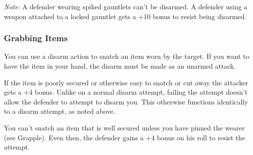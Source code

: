 \textit{Note:} A defender wearing spiked gauntlets can't be disarmed. A defender using a weapon attached to a locked gauntlet gets a +10 bonus to resist being disarmed.

\subsubsection{Grabbing Items}
You can use a disarm action to snatch an item worn by the target. If you want to have the item in your hand, the disarm must be made as an unarmed attack.

If the item is poorly secured or otherwise easy to snatch or cut away the attacker gets a +4 bonus. Unlike on a normal disarm attempt, failing the attempt doesn't allow the defender to attempt to disarm you. This otherwise functions identically to a disarm attempt, as noted above.

You can't snatch an item that is well secured unless you have pinned the wearer (see Grapple). Even then, the defender gains a +4 bonus on his roll to resist the attempt.